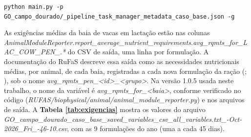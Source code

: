 \documentclass[a4paper,12pt]{article}
\begin{document}
\begin{lstlisting}[caption={Execução do caso base.}, label={lst:casobase}]
python main.py -p GO_campo_dourado/_pipeline_task_manager_metadata_caso_base.json -g
\end{lstlisting}

As exigências médias da baia de vacas em lactação estão nas colunas \textit{AnimalModuleReporter.\allowbreak report\_\allowbreak average\_\allowbreak nutrient\_\allowbreak requirements.\allowbreak avg\_\allowbreak rqmts\_\allowbreak for\_\allowbreak LAC\_\allowbreak COW\_\allowbreak PEN\_.*} do CSV de saída, uma linha por formulação. A documentação do RuFaS descreve essa saída como as necessidades nutricionais médias, por animal, de cada baia, registradas a cada nova formulação da ração (\cite[p.~58 e 85]{rufas:scidoc}; \cite[p.~9]{rufas:dicionario}), sob o nome \textit{avg\_\allowbreak rqmts\_\allowbreak pen\_\allowbreak <id>\_\allowbreak <grupo>}. Na versão 1.0.5 usada neste trabalho, o nome da variável é \textit{avg\_\allowbreak rqmts\_\allowbreak for\_\allowbreak <baia>}, conforme verificado no código (\textit{RUFAS/\allowbreak biophysical/\allowbreak animal/\allowbreak animal\_\allowbreak module\_\allowbreak reporter.py}) e nos arquivos de saída. A \textbf{Tabela \ref{tab:exigencias}} mostra os valores do arquivo \textit{GO\_\allowbreak campo\_\allowbreak dourado\_\allowbreak caso\_\allowbreak base\_\allowbreak saved\_\allowbreak variables\_\allowbreak csv\_\allowbreak all\_\allowbreak variables.txt\_-Oct-2026\_\allowbreak Fri\_-46-10.csv}, com as 9 formulações do ano (uma a cada 45 dias).
\end{document}
